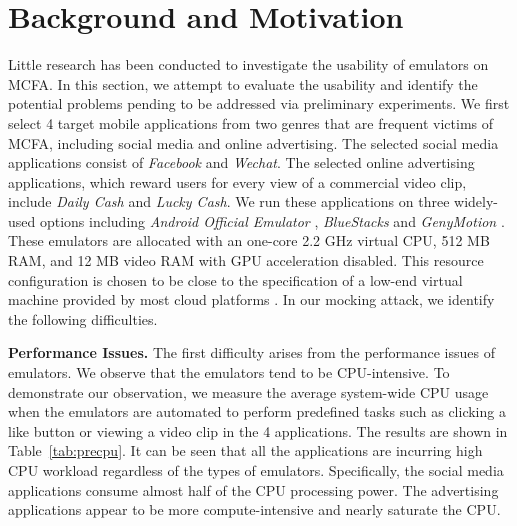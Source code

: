 \documentclass[conference]{IEEEtranl}
\begin{document}
	\section{Background and Motivation}\label{motivate}
	Little research has been conducted to investigate the usability of emulators on MCFA. 
	In this section, we attempt to evaluate the usability and identify the potential problems pending to be addressed via preliminary experiments.
	We first select 4 target mobile applications from two genres that are frequent victims of MCFA, including social media and online advertising. The selected social media applications consist of \textit{Facebook} and \textit{Wechat}. The selected online advertising applications, which reward users for every view of a commercial video clip, include \textit{Daily Cash} and \textit{Lucky Cash}.
	We run these applications on three widely-used options including \textit{Android Official Emulator} \cite{andemu}, \textit{BlueStacks} \cite{bluestack} and \textit{GenyMotion} \cite{genymotion}. These emulators are allocated with an one-core 2.2 GHz virtual CPU, 512 MB RAM, and 12 MB video RAM with GPU acceleration disabled. This resource configuration is chosen to be close to the specification of a low-end virtual machine provided by most cloud platforms \cite{vpscom}. In our mocking attack, we identify the following difficulties.

	\textbf{Performance Issues.} The first difficulty arises from the performance issues of emulators. We observe that the emulators tend to be CPU-intensive. 
	To demonstrate our observation, we measure the average system-wide CPU usage when the emulators are automated to perform predefined tasks such as clicking a like button or viewing a video clip in the 4 applications. The results are shown in Table~\ref{tab:precpu}. It can be seen that 
	all the applications are incurring high CPU workload regardless of the types of emulators. Specifically, the social media applications consume almost half of the CPU processing power. The advertising applications appear to be more compute-intensive and nearly saturate the CPU. 
\end{document}
